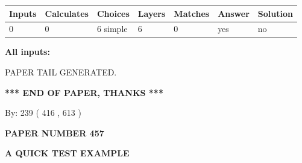 \documentclass[12pt]{article}
\begin{document}
 
\noindent{}
 
 
   
   
   
   
\noindent\begin{tabular}{|l|l|l|l|l|l|l|}
 \hline
Inputs & Calculates & Choices & Layers & Matches & Answer & Solution \\ \hline
 0  & 
 0  & 
 6
  simple  
  & 
 6  & 
 0  & 
  yes & 
  no 
  \\ \hline
 \end{tabular}
   
   
   
   
\noindent{}
   
   
   
   
\noindent\vspace{0.1in}\hspace{-0.08in} {\textbf{\Large{All inputs: }}}
   
   
   
   
   
   
 \vspace{0.2in}
 
   
   
\vspace{2.0in} PAPER TAIL GENERATED.
   
   
   
   
\vspace{1.0in} 
{\textbf{\large{ *** END OF PAPER, THANKS *** }}} 
   
   
\hspace{1.0in} By: 
 239 ( 416 ,  613 )
   
   
   
   
\newpage 
\setcounter{page}{ 
   457001 } 
   
   
   
   
 {\textbf{ \Large{ PAPER NUMBER  457  }}}
   
   
\vspace{0.2in}
   
   
   
   
   
   
   
   
 \vspace{0.2in}
{\LARGE {\textbf{ A QUICK TEST EXAMPLE}}}
   
\end{document}
